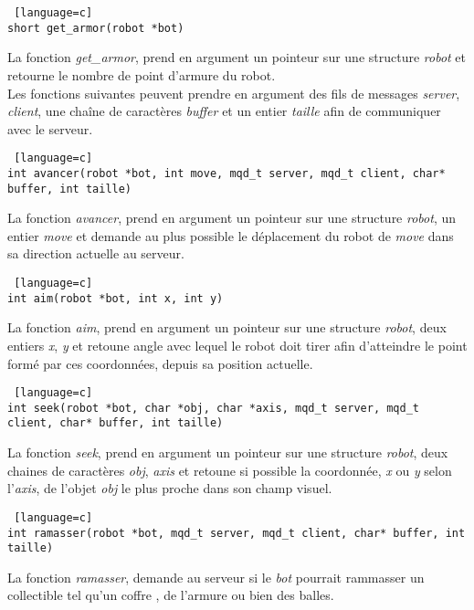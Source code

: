 \documentclass[a4paper, 11pt]{article}
\begin{document}
\begin {lstlisting} [language=c]
short get_armor(robot *bot)
\end{lstlisting}
La fonction \emph{get\_armor}, prend en argument un pointeur sur une structure \emph{robot} et retourne le nombre de point d'armure du robot.\\

Les fonctions suivantes peuvent prendre en argument des fils de messages \emph{server}, \emph{client}, une chaîne de caractères \emph{buffer} et un entier \emph{taille} afin de communiquer avec le serveur.\\

\begin {lstlisting} [language=c]
int avancer(robot *bot, int move, mqd_t server, mqd_t client, char* buffer, int taille)
\end{lstlisting}
La fonction \emph{avancer}, prend en argument un pointeur sur une structure \emph{robot}, un entier \emph{move} et demande au plus possible le déplacement du robot de \emph{move} dans sa direction actuelle au serveur.\\

\begin {lstlisting} [language=c]
int aim(robot *bot, int x, int y)
\end{lstlisting}
La fonction \emph{aim}, prend en argument un pointeur sur une structure \emph{robot}, deux entiers \emph{x}, \emph{y} et retoune angle avec lequel le robot doit tirer afin d'atteindre le point formé par ces coordonnées, depuis sa position actuelle.\\

\begin {lstlisting} [language=c]
int seek(robot *bot, char *obj, char *axis, mqd_t server, mqd_t client, char* buffer, int taille)
\end{lstlisting}
La fonction \emph{seek}, prend en argument un pointeur sur une structure \emph{robot}, deux chaines de caractères \emph{obj}, \emph{axis} et retoune si possible la coordonnée, \emph{x} ou \emph{y} selon l'\emph{axis}, de l'objet \emph{obj} le plus proche dans son champ visuel.\\

\begin {lstlisting} [language=c]
int ramasser(robot *bot, mqd_t server, mqd_t client, char* buffer, int taille)
\end{lstlisting}
La fonction \emph{ramasser}, demande au serveur si le \emph{bot} pourrait rammasser un collectible tel qu'un coffre , de l'armure ou bien des balles.\\
\end{document}
